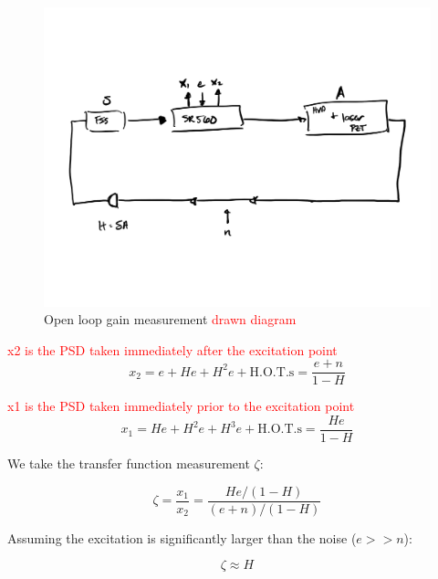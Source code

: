 \begin{figure}[H]
  \begin{center}
    \includegraphics[width=.5\textwidth]{figs/ALGAAS/Loop_gain_measurement_drawn_diagram.pdf}
    \caption{Open loop gain measurement \textcolor{red}{drawn diagram}}
  \end{center}
  \label{fig:spiceFSS}
\end{figure}

\textcolor{red}{x2 is the PSD taken immediately after the excitation point}
\begin{equation}
x_2 = e + He + H^2 e + \mathrm{H.O.T.s} = \frac{e + n}{1-H}
\end{equation}

\textcolor{red}{x1 is the PSD taken immediately prior to the excitation point}
\begin{equation}
x_1 = He + H^2e + H^3e + \mathrm{H.O.T.s}  = \frac{He}{1-H}
\end{equation}

We take the transfer function measurement $\zeta$:

\begin{equation}
\zeta = \frac{x_1}{x_2} = \frac{He/(1-H)}{(e+n)/(1-H)}
\end{equation}

Assuming the excitation is significantly larger than the noise ($e>>n$):

\begin{equation}
\zeta \approx H
\end{equation}
